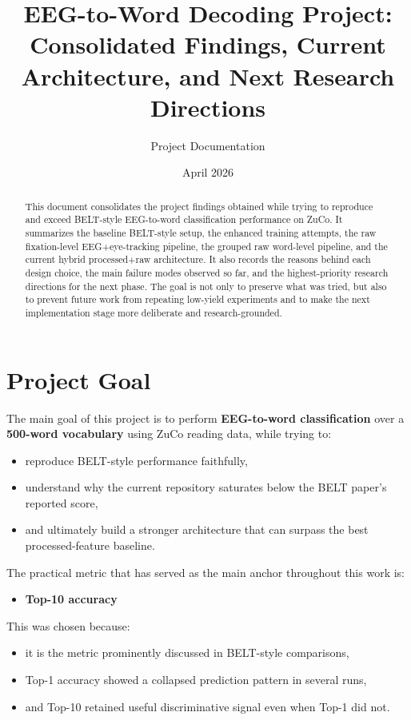 \documentclass[11pt]{article}
\title{EEG-to-Word Decoding Project: Consolidated Findings, Current Architecture, and Next Research Directions}
\author{Project Documentation}
\date{April 2026}
\begin{document}
\maketitle

\begin{abstract}
This document consolidates the project findings obtained while trying to reproduce and exceed BELT-style EEG-to-word classification performance on ZuCo. It summarizes the baseline BELT-style setup, the enhanced training attempts, the raw fixation-level EEG+eye-tracking pipeline, the grouped raw word-level pipeline, and the current hybrid processed+raw architecture. It also records the reasons behind each design choice, the main failure modes observed so far, and the highest-priority research directions for the next phase. The goal is not only to preserve what was tried, but also to prevent future work from repeating low-yield experiments and to make the next implementation stage more deliberate and research-grounded.
\end{abstract}

\tableofcontents
\newpage

\section{Project Goal}

The main goal of this project is to perform \textbf{EEG-to-word classification} over a \textbf{500-word vocabulary} using ZuCo reading data, while trying to:
\begin{itemize}
    \item reproduce BELT-style performance faithfully,
    \item understand why the current repository saturates below the BELT paper's reported score,
    \item and ultimately build a stronger architecture that can surpass the best processed-feature baseline.
\end{itemize}

The practical metric that has served as the main anchor throughout this work is:
\begin{itemize}
    \item \textbf{Top-10 accuracy}
\end{itemize}

This was chosen because:
\begin{itemize}
    \item it is the metric prominently discussed in BELT-style comparisons,
    \item Top-1 accuracy showed a collapsed prediction pattern in several runs,
    \item and Top-10 retained useful discriminative signal even when Top-1 did not.
\end{itemize}
\end{document}
